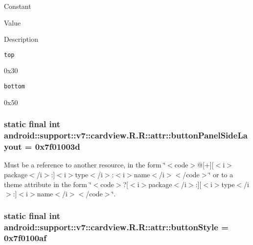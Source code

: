 Constant

Value

Description 

{\tt top}

0x30

{\tt bottom}

0x50\hypertarget{classandroid_1_1support_1_1v7_1_1cardview_1_1_r_1_1attr_c129fab21c56464f10321e6e7eddf21b}{
\subsubsection[{buttonPanelSideLayout}]{\setlength{\rightskip}{0pt plus 5cm}static final int android::support::v7::cardview.R.R::attr::buttonPanelSideLayout = 0x7f01003d}}
\label{classandroid_1_1support_1_1v7_1_1cardview_1_1_r_1_1attr_c129fab21c56464f10321e6e7eddf21b}


Must be a reference to another resource, in the form \char`\"{}$<$code$>$@\mbox{[}+\mbox{]}\mbox{[}$<$i$>$package$<$/i$>$:\mbox{]}$<$i$>$type$<$/i$>$:$<$i$>$name$<$/i$>$$<$/code$>$\char`\"{} or to a theme attribute in the form \char`\"{}$<$code$>$?\mbox{[}$<$i$>$package$<$/i$>$:\mbox{]}\mbox{[}$<$i$>$type$<$/i$>$:\mbox{]}$<$i$>$name$<$/i$>$$<$/code$>$\char`\"{}. \hypertarget{classandroid_1_1support_1_1v7_1_1cardview_1_1_r_1_1attr_2c4b2fdc23da4d93bfa48ee75a71f521}{
\subsubsection[{buttonStyle}]{\setlength{\rightskip}{0pt plus 5cm}static final int android::support::v7::cardview.R.R::attr::buttonStyle = 0x7f0100af}}
\label{classandroid_1_1support_1_1v7_1_1cardview_1_1_r_1_1attr_2c4b2fdc23da4d93bfa48ee75a71f521}


